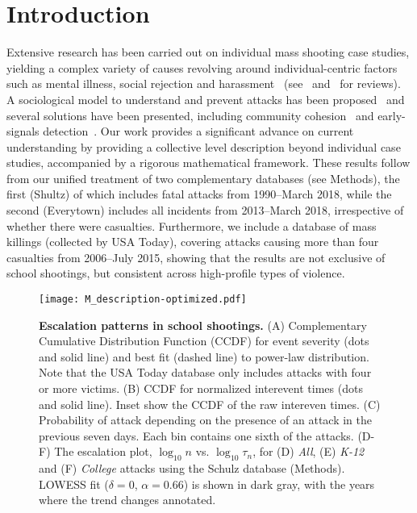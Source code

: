 \section*{Introduction}
Extensive research has been carried out on individual mass shooting
case studies, yielding a complex variety of causes revolving around
individual-centric factors such as mental illness, social rejection
and harassment~\cite{Newman2004,Flannery2013,Kimmel2003,Leary2003}
(see~\cite{Muschert2006} and~\cite{O2000} for reviews). 
A sociological model to understand and prevent attacks has been
proposed~\cite{Levin2009} and several solutions have been presented,
including community cohesion~\cite{Newman2004} and early-signals
detection~\cite{Wike2009, Borum2010}. 
Our work provides a significant advance on current understanding by
providing a collective level description beyond individual case
studies, accompanied by a rigorous mathematical framework. 
These results follow from our unified treatment of two complementary
databases (see Methods), the first (Shultz) of which includes fatal
attacks from 1990--March 2018, while the second (Everytown)
includes all incidents from 2013--March 2018, irrespective of
whether there were casualties. 
Furthermore, we include a database of mass killings (collected by USA
Today), covering attacks causing more than four casualties from
2006--July 2015, showing that the results are not exclusive of school
shootings, but consistent across high-profile types of violence. 

\begin{figure*}[htp!]
  \centering
  \texttt{[image: M\_description-optimized.pdf]}
  \caption{ 
    \textbf{Escalation patterns in school shootings.} 
    (A) Complementary Cumulative Distribution Function (CCDF) for
    event severity (dots and solid line) and best fit (dashed line) to
    power-law distribution. Note that the USA Today database only
    includes attacks with four or more victims.
    (B) CCDF for normalized interevent times (dots and solid
    line). Inset show the CCDF of the raw intereven times.
    (C) Probability of attack depending on the presence of an attack
    in the previous seven days. Each bin contains one sixth of the
    attacks.
    (D-F) The escalation plot, $\log_{10}{n}$ vs. $\log_{10}{\tau_n}$,
    for (D) \textit{All}, (E) \textit{K-12} and (F) \textit{College}
    attacks using the Schulz database (Methods).
    LOWESS fit ($\delta = 0$, $\alpha = 0.66$) is shown in dark gray,
    with the years where the trend changes annotated.
  }
  \label{fig:M_description}
\end{figure*}


